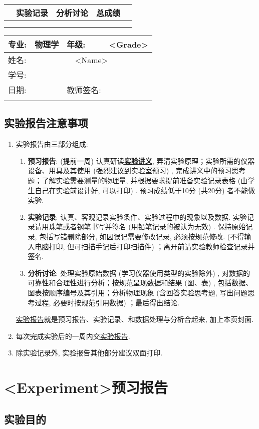 \documentclass{ctexart}
\title{\experimentname}
\author{\stuID \student}
\date{\today}
\newcommand{\experimentname}{<Experiment>}
\newcommand{\student}{<Name>}
\newcommand{\Grade}{<Grade>}
\newcommand{\stuID}{<Student ID>}
\newcommand{\previewdate}{<Preview Date>}
\newcommand{\inlinemaketitle}{{\let\newpage\relax\maketitle}}
\theoremstyle{ansstyle}
\newcommand{\infotable}{%
    \begin{center}
        \begin{tabular}{|p{1.49cm}<{\centering}|p{1.49cm}<{\centering}|p{1.49cm}<{\centering}|p{1.49cm}<{\centering}|p{1.49cm}<{\centering}|p{1.49cm}<{\centering}|p{1.49cm}<{\centering}|p{1.49cm}<{\centering}|}
            \specialrule{0em}{0.3cm}{0cm}
            \hline
            \multicolumn{2}{|c|}{\LARGE 预习实验} & \multicolumn{2}{c|}{\LARGE 实验记录}& \multicolumn{2}{c|}{\LARGE 分析讨论} & \multicolumn{2}{c|}{\LARGE 总成绩} \\
            \hline
            &&&&&&& \\
            \hline
            \specialrule{0em}{0.3cm}{0cm}
        \end{tabular}
    \end{center}%
}
\newcommand{\previewdata}{%
    \begin{center}
        \begin{tabular}{|p{1.5cm}|p{4.5cm}|p{4cm}|p{3.65cm}|}
            \hline
            {\large 专业}:  & {\large 物理学}    & {\large 年级: }    & {\large \Grade} \\
            \hline
            {\large 姓名: } & \multicolumn{3}{c|}{\large \student} \\
            \hline
            {\large 学号: }  & \multicolumn{3}{c|}{\large \stuID} \\
            \hline
            {\large 日期: } & {\large \previewdate} & {\large 教师签名: } & \\
            \hline
            \specialrule{0em}{0.6cm}{0cm}
        \end{tabular}
    \end{center}%
}
\begin{document}
\noindent
\renewcommand\arraystretch{1.8}
\infotable

\renewcommand\arraystretch{1.3}
\previewdata

\inlinemaketitle
\tableofcontents

\subsection{实验报告注意事项}
    
\begin{enumerate}
    \item 实验报告由三部分组成: 
    \begin{enumerate}
        \item \textbf{预习报告}: 
         (提前一周) 认真研读\underline{\textbf{实验讲义}}, 弄清实验原理；实验所需的仪器设备、用具及其使用 (强烈建议到实验室预习) , 完成讲义中的预习思考题；了解实验需要测量的物理量, 并根据要求提前准备实验记录表格 (由学生自己在实验前设计好, 可以打印) . 预习成绩低于10分 (共20分) 者不能做实验. 
        \item \textbf{实验记录}: 
        认真、客观记录实验条件、实验过程中的现象以及数据. 实验记录请用珠笔或者钢笔书写并签名 ({\color{red}用铅笔记录的被认为无效}) . {\color{red}保持原始记录, 包括写错删除部分, 如因误记需要修改记录, 必须按规范修改. } (不得输入电脑打印, 但可扫描手记后打印扫描件) ；离开前请实验教师检查记录并签名. 
        \item \textbf{分析讨论}: 
        处理实验原始数据 (学习仪器使用类型的实验除外) , 对数据的可靠性和合理性进行分析；按规范呈现数据和结果 (图、表) , 包括数据、图表按顺序编号及其引用；分析物理现象 (含回答实验思考题, 写出问题思考过程, 必要时按规范引用数据) ；最后得出结论. 
    \end{enumerate}
    \underline{实验报告}就是预习报告、实验记录、和数据处理与分析合起来, 加上本页封面. 
    \item 每次完成实验后的一周内交\underline{实验报告}. 
    \item 除实验记录外, 实验报告其他部分建议双面打印. 
\end{enumerate}


\section*{\experimentname 预习报告}

\subsection{实验目的}
\end{document}
